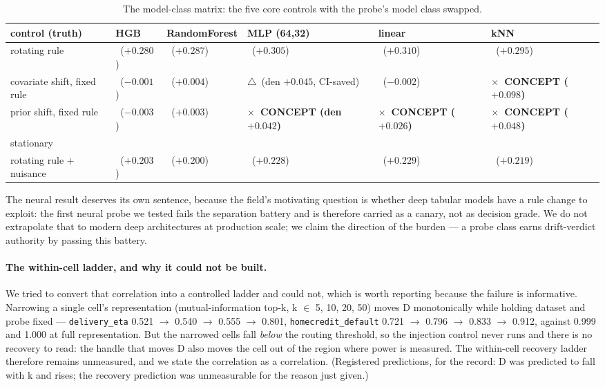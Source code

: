 \documentclass[10pt]{article} %
\newcommand{\yes}{\checkmark}
\newcommand{\no}{$\times$}
\newcommand{\marginalmark}{$\triangle$}
\begin{document}
\begin{table}[t]
\caption{The model-class matrix: the five core controls with the probe's model class swapped.}
\label{tab:classmatrix}
\centering
\footnotesize
\setlength{\tabcolsep}{3.5pt}
\begin{tabular}{@{}>{\raggedright\arraybackslash}p{1.05in}>{\centering\arraybackslash}p{0.72in}>{\centering\arraybackslash}p{0.85in}>{\centering\arraybackslash}p{1.15in}>{\centering\arraybackslash}p{1.05in}>{\centering\arraybackslash}p{1.05in}@{}}
\toprule
control (truth) & HGB & RandomForest & MLP (64,32) & linear & kNN \\
\midrule
rotating rule & \yes\ ($+0.280$) & \yes\ ($+0.287$) & \yes\ ($+0.305$) & \yes\ ($+0.310$) & \yes\ ($+0.295$) \\
covariate shift, fixed rule & \yes\ ($-0.001$) & \yes\ ($+0.004$) & \marginalmark\ (den $+0.045$, CI-saved) & \yes\ ($-0.002$) & \textbf{\no\ CONCEPT ($+0.098$)} \\
prior shift, fixed rule & \yes\ ($-0.003$) & \yes\ ($+0.003$) & \textbf{\no\ CONCEPT (den $+0.042$)} & \textbf{\no\ CONCEPT ($+0.026$)} & \textbf{\no\ CONCEPT ($+0.048$)} \\
stationary & \yes & \yes & \yes & \yes & \yes \\
rotating rule + nuisance & \yes\ ($+0.203$) & \yes\ ($+0.200$) & \yes\ ($+0.228$) & \yes\ ($+0.229$) & \yes\ ($+0.219$) \\
\bottomrule
\end{tabular}
\end{table}

The neural result deserves its own sentence, because the field's motivating question is whether
deep tabular models have a rule change to exploit: the first neural probe we tested fails the
separation battery and is therefore carried as a canary, not as decision grade. We do not
extrapolate that to modern deep architectures at production scale; we claim the direction of the
burden --- a probe class earns drift-verdict authority by passing this battery.

\paragraph{The within-cell ladder, and why it could not be built.}

We tried to convert that correlation into a controlled ladder and could not, which is worth
reporting because the failure is informative. Narrowing a single cell's representation
(mutual-information top-k, k $\in$ {5, 10, 20, 50}) moves D monotonically while holding dataset and
probe fixed --- \texttt{delivery\_eta} 0.521 $\to$ 0.540 $\to$ 0.555 $\to$ 0.801, \texttt{homecredit\_default} 0.721 $\to$ 0.796 $\to$
0.833 $\to$ 0.912, against 0.999 and 1.000 at full representation. But the narrowed cells fall
\emph{below} the routing threshold, so the injection control never runs and there is no recovery to
read: the handle that moves D also moves the cell out of the region where power is measured. The
within-cell recovery ladder therefore remains unmeasured, and we state the correlation as a
correlation. (Registered predictions, for the record: D was predicted to fall with k and rises;
the recovery prediction was unmeasurable for the reason just given.)
\end{document}
